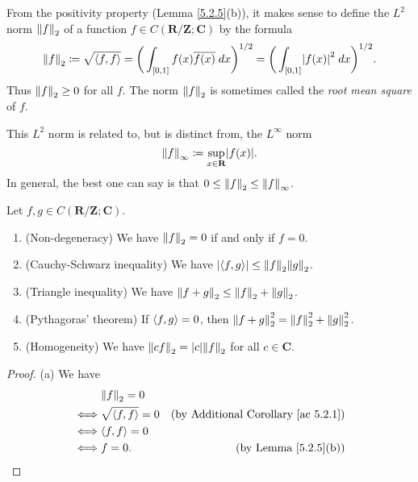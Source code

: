 \begin{additional corollary}\label{ac 5.2.1}
From the positivity property (Lemma \ref{5.2.5}(b)), it makes sense to define the \(L^2\) norm \(\norm*{f}_2\) of a function \(f \in C(\mathbf{R} / \mathbf{Z} ; \mathbf{C})\) by the formula
\[
    \norm*{f}_2 \coloneqq \sqrt{\inner*{f, f}} = \bigg(\int_{[0, 1]} f(x) \overline{f(x)} \; dx\bigg)^{1 / 2} = \bigg(\int_{[0, 1]} \abs*{f(x)}^2 \; dx\bigg)^{1 / 2}.
\]
Thus \(\norm*{f}_2 \geq 0\) for all \(f\).
The norm \(\norm*{f}_2\) is sometimes called the \emph{root mean square} of \(f\).
\end{additional corollary}

\begin{note}
    This \(L^2\) norm is related to, but is distinct from, the \(L^\infty\) norm
    \[
        \norm*{f}_\infty \coloneqq \sup_{x \in \mathbf{R}} \abs*{f(x)}.
    \]
    In general, the best one can say is that \(0 \leq \norm*{f}_2 \leq \norm*{f}_\infty\).
\end{note}

\setcounter{theorem}{6}
\begin{lemma}\label{5.2.7}
    Let \(f, g \in C(\mathbf{R} / \mathbf{Z} ; \mathbf{C})\).
    \begin{enumerate}
        \item (Non-degeneracy)
              We have \(\norm*{f}_2 = 0\) if and only if \(f = 0\).
        \item (Cauchy-Schwarz inequality)
              We have \(\abs*{\inner*{f, g}} \leq \norm*{f}_2 \norm*{g}_2\).
        \item (Triangle inequality)
              We have \(\norm*{f + g}_2 \leq \norm*{f}_2 + \norm*{g}_2\).
        \item (Pythagoras’ theorem)
              If \(\inner*{f, g} = 0\), then \(\norm*{f + g}_2^2 = \norm*{f}_2^2 + \norm*{g}_2^2\).
        \item (Homogeneity)
              We have \(\norm*{cf}_2 = \abs*{c} \norm*{f}_2\) for all \(c \in \mathbf{C}\).
    \end{enumerate}
\end{lemma}

\begin{proof}{(a)}
    We have
    \begin{align*}
             & \norm*{f}_2 = 0                                                            \\
        \iff & \sqrt{\inner*{f, f}} = 0 & \text{(by Additional Corollary \ref{ac 5.2.1})} \\
        \iff & \inner*{f, f} = 0                                                          \\
        \iff & f = 0.                   & \text{(by Lemma \ref{5.2.5}(b))}
    \end{align*}
\end{proof}

